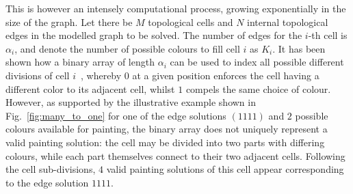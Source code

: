 \documentclass[conference]{IEEEtran}
\begin{document}
This is however an intensely computational process, growing exponentially in the size of the graph. Let there be $M$ topological cells and $N$ internal topological edges in the modelled graph to be solved. The number of edges for the $i$-th cell is $\alpha_i$, and denote the number of possible colours to fill cell $i$ as $K_i$.   
It has been shown how a binary array of length $\alpha_i$ can be used to index all possible different divisions of cell $i$~\cite{Yang2020Cellular}, whereby 
$0$ at a given position enforces the cell having a different color to its adjacent cell, whilst $1$ compels the same choice of colour. 
However, as supported by the illustrative example shown in Fig.~\ref{fig:many_to_one} for one of the edge solutions $(1111)$ and $2$ possible colours available for painting, the binary array does not uniquely represent a valid painting solution: the cell may be divided into two parts with differing colours, while each part themselves connect to their two adjacent cells. Following the cell sub-divisions, $4$ valid painting solutions of this cell appear corresponding to the edge solution $1111$. 
\end{document}
